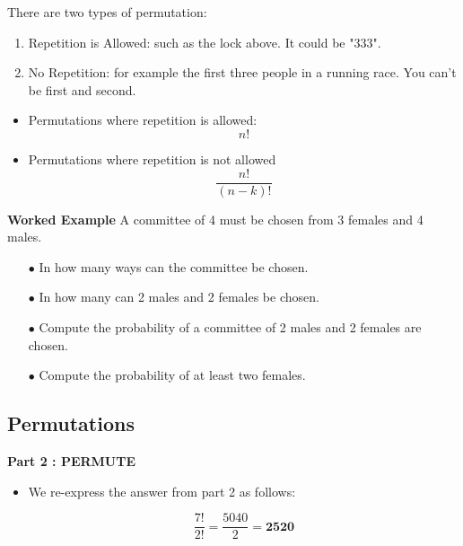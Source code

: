 \documentclass[]{report}
\begin{document}
{There are two types of permutation:
\begin{enumerate}
	\item Repetition is Allowed: such as the lock above. It could be "333".
	\item No Repetition: for example the first three people in a running race. You can't be first and second.
\end{enumerate}



\begin{framed}
\begin{itemize}
	\item Permutations where repetition is allowed: 
	\[ n! \]
	\item Permutations where repetition is not allowed
	\[ \frac{n!}{(n-k)!} \]
\end{itemize}
\end{framed}

	\noindent \textbf{Worked Example}
	A committee of 4 must be chosen from 3 females and 4 males.
	
	\begin{itemize}
		\item[$\bullet$] In how many ways can the committee be chosen.
		\item[$\bullet$] In how many can 2 males and 2 females be chosen.
		\item[$\bullet$]  Compute the probability of a committee of 2 males and 2 females are chosen.
		\item[$\bullet$] Compute the probability of at least two females.
	\end{itemize}
	\bigskip
}


%



\subsection{Permutations}


\textbf{Part 2 : PERMUTE}\\
\begin{itemize}
	\item We re-express the answer from part 2 as follows:
	
	\[\frac{7!}{2!} =  \frac{5040}{2} = \boldsymbol{2520} \]
\end{itemize}
\end{document}
